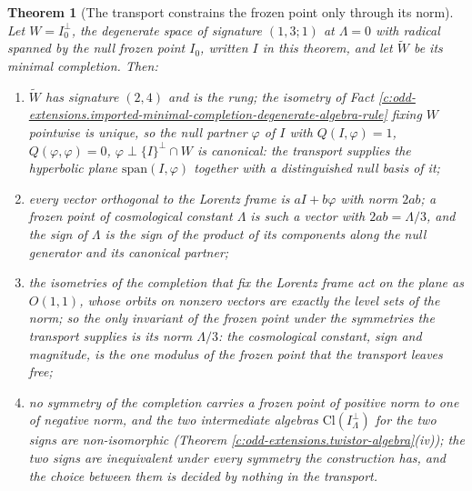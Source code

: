 \documentclass[11pt]{article}
\newtheorem{theorem}{Theorem}[section]
\theoremstyle{definition}
\theoremstyle{plain}
\providecommand{\Cl}{}\renewcommand{\Cl}{\mathrm{Cl}}
\begin{document}
\begin{theorem}[The transport constrains the frozen point only through its norm]\label{c:odd-extensions.transport-constrains-frozen-point-only-through}
Let $W = I_{0}^{\perp}$, the degenerate space of signature $(1,3;1)$ at $\Lambda = 0$ with radical spanned by the null frozen point $I_{0}$, written $I$ in this theorem, and let $\widetilde W$ be its minimal completion. Then:
\begin{enumerate}
\item[(i)] $\widetilde W$ has signature $(2,4)$ and is the rung; the isometry of Fact \ref{c:odd-extensions.imported-minimal-completion-degenerate-algebra-rule} fixing $W$ pointwise is unique, so the null partner $\varphi$ of $I$ with $Q(I,\varphi) = 1$, $Q(\varphi,\varphi) = 0$, $\varphi \perp \{I\}^{\perp} \cap W$ is canonical: the transport supplies the hyperbolic plane $\mathrm{span}(I, \varphi)$ together with a distinguished null basis of it;
\item[(ii)] every vector orthogonal to the Lorentz frame is $aI + b\varphi$ with norm $2ab$; a frozen point of cosmological constant $\Lambda$ is such a vector with $2ab = \Lambda/3$, and the sign of $\Lambda$ is the sign of the product of its components along the null generator and its canonical partner;
\item[(iii)] the isometries of the completion that fix the Lorentz frame act on the plane as $O(1,1)$, whose orbits on nonzero vectors are exactly the level sets of the norm; so the only invariant of the frozen point under the symmetries the transport supplies is its norm $\Lambda/3$: the cosmological constant, sign and magnitude, is the one modulus of the frozen point that the transport leaves free;
\item[(iv)] no symmetry of the completion carries a frozen point of positive norm to one of negative norm, and the two intermediate algebras $\Cl(I_{\Lambda}^{\perp})$ for the two signs are non-isomorphic (Theorem \ref{c:odd-extensions.twistor-algebra}(iv)); the two signs are inequivalent under every symmetry the construction has, and the choice between them is decided by nothing in the transport.
\end{enumerate}
\end{theorem}
\end{document}
